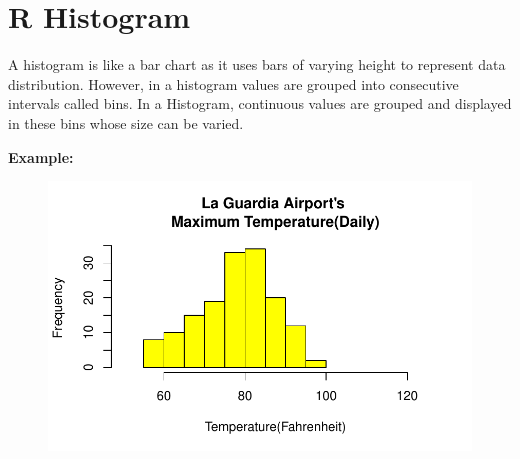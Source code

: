 \documentclass[
  letterpaper,
  DIV=11,
  numbers=noendperiod]{scrreprt}
\newenvironment{Shaded}{\begin{snugshade}}{\end{snugshade}}
\newcommand{\AttributeTok}[1]{\textcolor[rgb]{0.40,0.45,0.13}{#1}}
\newcommand{\CommentTok}[1]{\textcolor[rgb]{0.37,0.37,0.37}{#1}}
\newcommand{\ConstantTok}[1]{\textcolor[rgb]{0.56,0.35,0.01}{#1}}
\newcommand{\DecValTok}[1]{\textcolor[rgb]{0.68,0.00,0.00}{#1}}
\newcommand{\FunctionTok}[1]{\textcolor[rgb]{0.28,0.35,0.67}{#1}}
\newcommand{\NormalTok}[1]{\textcolor[rgb]{0.00,0.23,0.31}{#1}}
\newcommand{\SpecialCharTok}[1]{\textcolor[rgb]{0.37,0.37,0.37}{#1}}
\newcommand{\StringTok}[1]{\textcolor[rgb]{0.13,0.47,0.30}{#1}}
\begin{document}
\hypertarget{r-histogram}{%
\section{R Histogram}\label{r-histogram}}

A histogram is like a bar chart as it uses bars of varying height to
represent data distribution. However, in a histogram values are grouped
into consecutive intervals called bins. In a Histogram, continuous
values are grouped and displayed in these bins whose size can be varied.

\textbf{Example:}~

\begin{Shaded}
\end{Shaded}

\begin{figure}[H]

{\centering \includegraphics{assignment1_files/figure-pdf/unnamed-chunk-2-1.pdf}

}

\end{figure}
\end{document}
